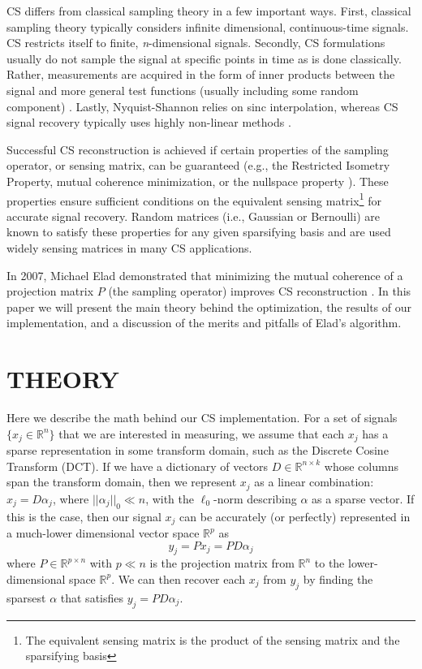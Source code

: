 \documentclass[journal]{IEEEtran}
\begin{document}
CS differs from classical sampling theory in a few important ways.  First, classical sampling theory typically considers infinite dimensional, continuous-time signals.  CS restricts itself to finite, \emph{n}-dimensional signals.  Secondly, CS formulations usually do not sample the signal at specific points in time as is done classically.  Rather, measurements are acquired in the form of inner products between the signal and more general test functions (usually including some random component) \cite{csbook}.  Lastly, Nyquist-Shannon relies on sinc interpolation, whereas CS signal recovery typically uses highly non-linear methods \cite{oppenheimdigital,csbook}.

Successful CS reconstruction is achieved if certain properties of the sampling operator, or sensing matrix, can be guaranteed (e.g., the Restricted Isometry Property, mutual coherence minimization, or the nullspace property \cite{tcs}).  These properties ensure sufficient conditions on the equivalent sensing matrix\footnote{The equivalent sensing matrix is the product of the sensing matrix and the sparsifying basis} for accurate signal recovery. Random matrices (i.e., Gaussian or Bernoulli) are known to satisfy these properties for any given sparsifying basis and are used widely sensing matrices in many CS applications.

In 2007, Michael Elad demonstrated that minimizing the mutual coherence of a projection matrix $P$ (the sampling operator) improves CS reconstruction \cite{elad}.  In this paper we will present the main theory behind the optimization, the results of our implementation, and a discussion of the merits and pitfalls of Elad's algorithm.

\section{THEORY}

Here we describe the math behind our CS implementation.  For a set of signals $\{x_j \in \mathbb{R}^n\}$ that we are interested in measuring, we assume that each $x_j$ has a sparse representation in some transform domain, such as the Discrete Cosine Transform (DCT).  If we have a dictionary of vectors $D \in \mathbb{R}^{n\times k}$ whose columns span the transform domain, then we represent $x_j$ as a linear combination: $x_j = D\alpha_j$, where $||\alpha_j||_0 \ll n$, with the $\ell_0$-norm describing $\alpha$ as a sparse vector.  If this is the case, then our signal $x_j$ can be accurately (or perfectly) represented in a much-lower dimensional vector space $\mathbb{R}^p$ as $$y_j = Px_j=PD\alpha_j$$ where $P \in \mathbb{R}^{p\times n}$ with $p \ll n$ is the projection matrix from $\mathbb{R}^n$ to the lower-dimensional space $\mathbb{R}^p$.  We can then recover each $x_j$ from $y_j$ by finding the sparsest $\alpha$ that satisfies $y_j = PD\alpha_j$.
\end{document}
